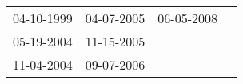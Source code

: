 \begin{supertabular}{llll}
 04-10-1999 &  04-07-2005 &  06-05-2008 \\
 05-19-2004 &  11-15-2005 &             \\
 11-04-2004 &  09-07-2006 &             \\
\end{supertabular}
